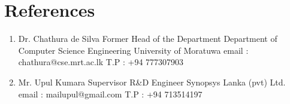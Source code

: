 \documentclass[letterpaper]{twentysecondcv} %
\begin{document}
\newpage

\profile 



\section{References}
\newline
\begin{enumerate}
    \item Dr. Chathura de Silva\newline
Former Head of the Department\newline
Department of Computer Science Engineering\newline
University of Moratuwa \newline
email : chathura@cse.mrt.ac.lk \newline
T.P : +94 777307903
\newline \newline
\item Mr. Upul Kumara\newline
Supervisor R&D Engineer\newline
Synopsys Lanka (pvt) Ltd. \newline
email : mailupul@gmail.com\newline
T.P : +94 713514197


\end{enumerate}
\end{document}
